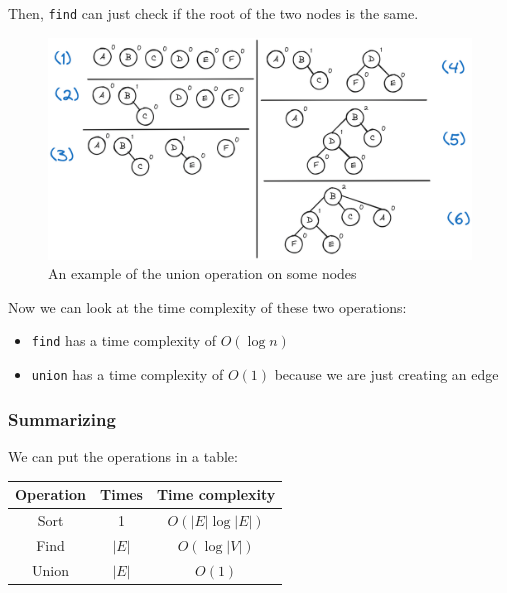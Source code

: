 \documentclass[12pt]{extarticle}
\begin{document}
Then, \texttt{find} can just check if the root of the two nodes is the same.

\begin{figure}[H]
    \centering
    \includegraphics[width=\textwidth]{assets/S2_P1_CS2/union_find.png}
    \caption{An example of the union operation on some nodes}
    \label{fig:union_find}
\end{figure}

Now we can look at the time complexity of these two operations:
\begin{itemize}
    \item \texttt{find} has a time complexity of $O(\log n)$
    \item \texttt{union} has a time complexity of $O(1)$ because we are just creating an edge
\end{itemize}

\subsubsection{Summarizing}

We can put the operations in a table:

\begin{table}[H]
    \centering
    \begin{tabular}{|c|c|c|}
        \hline
        \textbf{Operation} & \textbf{Times} & \textbf{Time complexity} \\
        \hline
        Sort               & 1              & $O(|E| \log |E|)$        \\
        Find               & $|E|$          & $O(\log |V|)$            \\
        Union              & $|E|$          & $O(1)$                   \\
        \hline
    \end{tabular}
\end{table}
\end{document}
